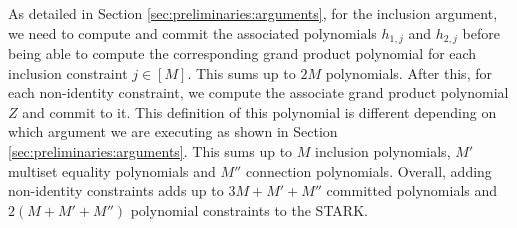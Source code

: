 As detailed in Section \ref{sec:preliminaries:arguments}, for the 
inclusion argument, we need to compute and commit the associated polynomials $h_{1,j}$ and $h_{2,j}$ before being able to compute the corresponding grand product polynomial for each inclusion constraint $j \in [M]$. 
This sums up to $2M$ polynomials.
After this, for each non-identity constraint, we compute the associate grand product polynomial $Z$ and commit to it. This definition of this polynomial is different depending on which argument we are executing as
shown in Section \ref{sec:preliminaries:arguments}.
This sums up to $M$ inclusion polynomials, $M'$ multiset equality polynomials and $M''$ connection polynomials. Overall, adding non-identity constraints adds up to $3M + M' + M''$ committed polynomials and $2(M+M'+M'')$ polynomial constraints to the STARK.

